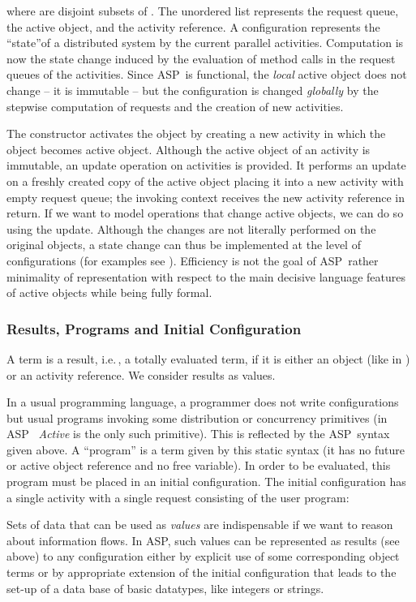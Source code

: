 \documentclass[10pt, conference, compsocconf]{IEEEtran}
\newcommand\aspfun{ASP\ }
\newcommand\aspfunp{ASP}
\newcommand\ie{i.e.\!\,, }
\begin{document}
{where  are disjoint subsets of  . 
The unordered list  represents the request queue, 
the active object, and  the activity reference.
A configuration represents the ``state''of a distributed system by the current parallel activities. 
Computation is now the state change induced by the evaluation of method calls in the request queues
of the activities.
Since \aspfun is functional, the {\it local} active object does not change -- it is immutable -- but the configuration is changed {\it globally}
by the stepwise computation of requests and the creation of new activities.

The constructor  activates the object  by creating a new activity 
in which the object  becomes active object. Although the active object of an activity is immutable, an update operation on
activities is provided. It performs an update on a freshly created copy
of the active object placing it into a new activity with empty request queue; 
the invoking context receives the new activity reference
in return. If we want to model operations that change active objects, we can do so using the
update. Although the changes are not literally performed on the original objects, a state change
can thus be implemented at the level of configurations (for examples see \cite{hkl:11}). 
Efficiency is not the goal of \aspfun rather 
minimality of representation with respect to the main decisive language features of 
active objects while being fully formal.




\subsubsection{Results, Programs and Initial Configuration}
A term is a result, \ie a totally evaluated term, if it is either an
object (like in \cite{AC96a}) or an activity reference. 
We consider results as values.

In a usual programming
language, a programmer does not write configurations but usual programs
invoking some distribution or concurrency primitives (in \aspfun
\emph{Active} is the only such primitive). This is reflected by the \aspfun syntax given 
above. A ``program'' is a term  given by this static
syntax (it has no future or active object reference and no free variable). In order to be
evaluated, this program must be placed in an initial
configuration. The initial configuration has a single activity with a single request consisting of the user program:

Sets of data that can be used as {\it values} are indispensable if we want to 
reason about information flows. In \aspfunp, such values can be represented as 
results (see above) to any configuration either by explicit use of some corresponding
object terms or by appropriate extension of the initial configuration that leads to
the set-up of a data base of basic datatypes, like integers or strings. 

}
\end{document}
